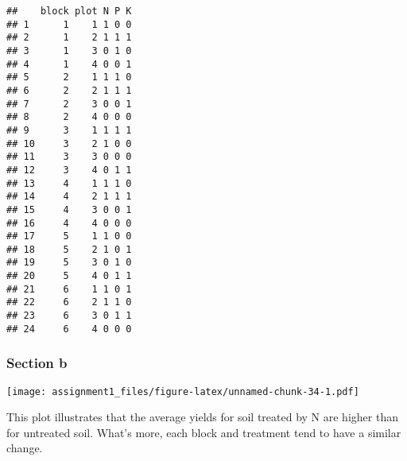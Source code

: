 \documentclass[
]{article}
\newenvironment{Shaded}{\begin{snugshade}}{\end{snugshade}}
\newcommand{\AttributeTok}[1]{\textcolor[rgb]{0.13,0.29,0.53}{#1}}
\newcommand{\CommentTok}[1]{\textcolor[rgb]{0.56,0.35,0.01}{\textit{#1}}}
\newcommand{\ConstantTok}[1]{\textcolor[rgb]{0.56,0.35,0.01}{#1}}
\newcommand{\FunctionTok}[1]{\textcolor[rgb]{0.13,0.29,0.53}{\textbf{#1}}}
\newcommand{\NormalTok}[1]{#1}
\newcommand{\OtherTok}[1]{\textcolor[rgb]{0.56,0.35,0.01}{#1}}
\newcommand{\SpecialCharTok}[1]{\textcolor[rgb]{0.81,0.36,0.00}{\textbf{#1}}}
\newcommand{\StringTok}[1]{\textcolor[rgb]{0.31,0.60,0.02}{#1}}
\begin{document}
\begin{verbatim}
##    block plot N P K
## 1      1    1 1 0 0
## 2      1    2 1 1 1
## 3      1    3 0 1 0
## 4      1    4 0 0 1
## 5      2    1 1 1 0
## 6      2    2 1 1 1
## 7      2    3 0 0 1
## 8      2    4 0 0 0
## 9      3    1 1 1 1
## 10     3    2 1 0 0
## 11     3    3 0 0 0
## 12     3    4 0 1 1
## 13     4    1 1 1 0
## 14     4    2 1 1 1
## 15     4    3 0 0 1
## 16     4    4 0 0 0
## 17     5    1 1 0 0
## 18     5    2 1 0 1
## 19     5    3 0 1 0
## 20     5    4 0 1 1
## 21     6    1 1 0 1
## 22     6    2 1 1 0
## 23     6    3 0 1 1
## 24     6    4 0 0 0
\end{verbatim}

\subsubsection{Section b}\label{section-b-1}

\begin{Shaded}
\end{Shaded}

\texttt{[image: assignment1\_files/figure-latex/unnamed-chunk-34-1.pdf]}

This plot illustrates that the average yields for soil treated by N are
higher than for untreated soil. What's more, each block and treatment
tend to have a similar change.
\end{document}
